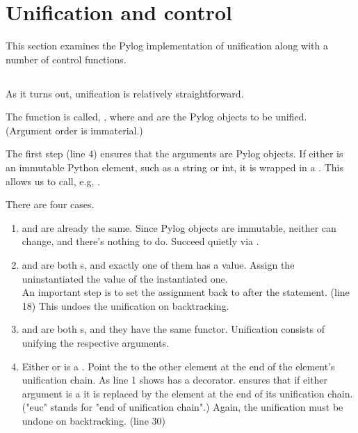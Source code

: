 \section{Unification and control}\label{subsec:unification}
This section examines the Pylog implementation of unification along with a number of control functions.

\subsection{}
As it turns out, unification is relatively straightforward. 

The  function is called, , where  and  are the Pylog objects to be unified. (Argument order is immaterial.) 

The first step (line 4) ensures that the arguments are Pylog objects. If either is an immutable Python element, such as a string or int, it is wrapped in a . This allows us to call, e.g, .
   
There are four  cases.

\begin{enumerate}
    \item {} and  are already the same. Since Pylog objects are immutable, neither can change, and there's nothing to do. Succeed quietly via .

    \item {} and  are both s, and exactly one of them has a value. Assign the uninstantiated  the value of the instantiated one.
    \smallv \\
    An important step is to set the assignment back to  after the  statement. (line 18) This undoes the unification on backtracking.

    \item {} and  are both s, and they have the same functor. Unification consists of unifying the respective arguments. 

    \item Either  or  is a . Point the  to the other element at the end of the  element's unification chain. As line 1 shows  has a decorator.  ensures that if either argument is a  it is replaced by the element at the end of its unification chain. ("euc" stands for "end of unification chain".) Again, the unification must be undone on backtracking. (line 30) 

\end{enumerate} 

